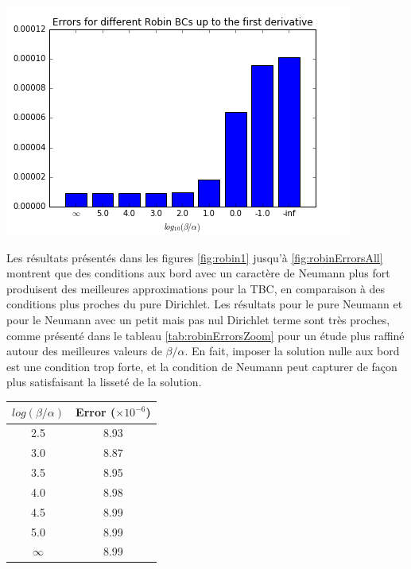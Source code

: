 \begingroup
\begin{center}
		\includegraphics[scale=.6]{figures/robinErrors1.png}
\end{center}
\endgroup

\indent Les résultats présentés dans les figures \ref{fig:robin1} jusqu'à \ref{fig:robinErrorsAll} montrent que des conditions aux bord avec un caractère de Neumann plus fort produisent des meilleures approximations pour la TBC, en comparaison à des conditions plus proches du pure Dirichlet. Les résultats pour le pure Neumann et pour le Neumann avec un petit mais pas nul Dirichlet terme sont très proches, comme présenté dans le tableau \ref{tab:robinErrorsZoom} pour un étude plus raffiné autour des meilleures valeurs de $\beta/\alpha$. En fait, imposer la solution nulle aux bord est une condition trop forte, et la condition de Neumann peut capturer de façon plus satisfaisant la lisseté de la solution.

\begingroup
\begin{center}
		\begin{tabular}{c|c}
			$log(\beta/\alpha)$ & Error ($\times 10^{-6}$) \\
			\hline
			2.5 & 8.93\\
			3.0 & 8.87\\
			3.5 & 8.95\\
			4.0 & 8.98\\
			4.5 & 8.99\\
			5.0 & 8.99\\
			$\infty$ & 8.99	
		\end{tabular}
\end{center}
\endgroup

